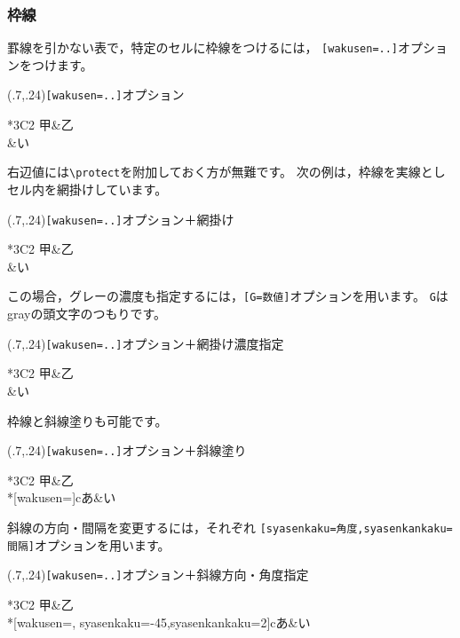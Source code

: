 \subsubsection{枠線}
罫線を引かない表で，特定のセルに枠線をつけるには，
\verb+[wakusen=..]+オプションをつけます。

\begin{showEx}(.7,.24){\texttt{[wakusen=..]}オプション}
\begin{Hyou}{*3{C{2\zw}}}
  甲&乙\\
  &い
\end{Hyou}
\end{showEx}

右辺値には\verb+\protect+を附加しておく方が無難です。
次の例は，枠線を実線としセル内を網掛けしています。

\begin{showEx}(.7,.24){\texttt{[wakusen=..]}オプション＋網掛け}
\begin{Hyou}{*3{C{2\zw}}}
  甲&乙\\
  &い
\end{Hyou}
\end{showEx}

この場合，グレーの濃度も指定するには，\verb+[G=数値]+オプションを用います。
\texttt{G}はgrayの頭文字のつもりです。

\begin{showEx}(.7,.24){\texttt{[wakusen=..]}オプション＋網掛け濃度指定}
\begin{Hyou}{*3{C{2\zw}}}
  甲&乙\\
  &い
\end{Hyou}
\end{showEx}

枠線と斜線塗りも可能です。

\begin{showEx}(.7,.24){\texttt{[wakusen=..]}オプション＋斜線塗り}
\begin{Hyou}{*3{C{2\zw}}}
  甲&乙\\
  \EMcell**[wakusen=\protect\drawline]{c}{あ}&い
\end{Hyou}
\end{showEx}

斜線の方向・間隔を変更するには，それぞれ
\verb+[syasenkaku=角度,syasenkankaku=間隔]+オプションを用います。

\begin{showEx}(.7,.24){\texttt{[wakusen=..]}オプション＋斜線方向・角度指定}
\begin{Hyou}{*3{C{2\zw}}}
  甲&乙\\
  \EMcell**[wakusen=\protect\drawline,%
    syasenkaku=-45,syasenkankaku=2]{c}{あ}&い
\end{Hyou}
\end{showEx}

